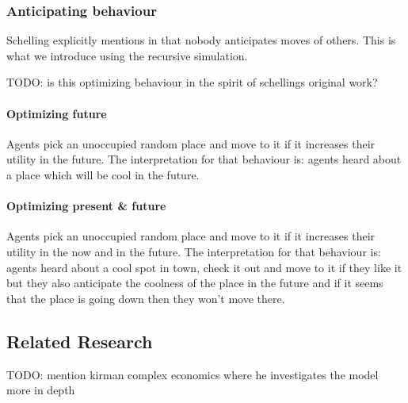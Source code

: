\subsubsection{Anticipating behaviour}
Schelling explicitly mentions in \cite{schelling_dynamic_1971} that nobody anticipates moves of others. This is what we introduce using the recursive simulation.

TODO: is this optimizing behaviour in the spirit of schellings original work? 

\paragraph{Optimizing future} Agents pick an unoccupied random place and move to it if it increases their utility in the future. The interpretation for that behaviour is: agents heard about a place which will be cool in the future.

\paragraph{Optimizing present \& future} Agents pick an unoccupied random place and move to it if it increases their utility in the now and in the future. The interpretation for that behaviour is: agents heard about a cool spot in town, check it out and move to it if they like it but they also anticipate the coolness of the place in the future and if it seems that the place is going down then they won't move there.

\subsection{Related Research}
TODO: \cite{kirman_complex_2010} mention kirman complex economics where he investigates the model more in depth
